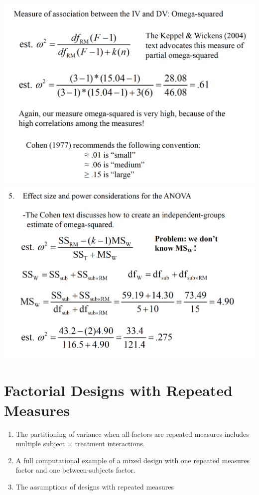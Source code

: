 \documentclass[]{book}
\providecommand{\tightlist}{%
  \setlength{\itemsep}{0pt}\setlength{\parskip}{0pt}}
\theoremstyle{definition}
\theoremstyle{definition}
\theoremstyle{definition}
\theoremstyle{remark}
\begin{document}
\includegraphics{img/hicksrma19.png}
\includegraphics{img/hicksrma20.png}

\chapter{Factorial Designs with Repeated
Measures}\label{factorial-designs-with-repeated-measures}

\begin{enumerate}
\def\labelenumi{\arabic{enumi}.}
\tightlist
\item
  The partitioning of variance when all factors are repeated measures
  includes multiple subject × treatment interactions.
\item
  A full computational example of a mixed design with one repeated
  measures factor and one between-subjects factor.
\item
  The assumptions of designs with repeated measures
\end{enumerate}
\end{document}
